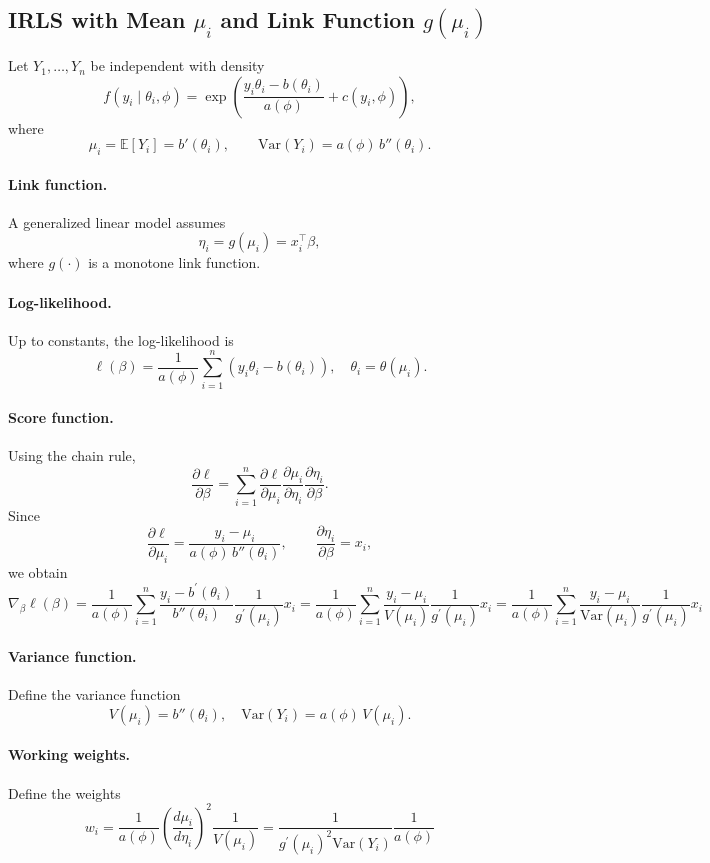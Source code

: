 \documentclass[11pt]{article}
\theoremstyle{definition}
\begin{document}
\subsection{IRLS with Mean $\mu_i$ and Link Function $g(\mu_i)$}

Let $Y_1,\dots,Y_n$ be independent with density
\[
f(y_i \mid \theta_i,\phi)
=
\exp\!\left(
\frac{y_i \theta_i - b(\theta_i)}{a(\phi)}
+ c(y_i,\phi)
\right),
\]
where
\[
\mu_i = \mathbb{E}[Y_i] = b'(\theta_i),
\qquad
\mathrm{Var}(Y_i) = a(\phi)\, b''(\theta_i).
\]

\paragraph{Link function.}
A generalized linear model assumes
\[
\eta_i = g(\mu_i) = x_i^\top \beta,
\]
where $g(\cdot)$ is a monotone link function.

\paragraph{Log-likelihood.}
Up to constants, the log-likelihood is
\[
\ell(\beta)
=
\frac{1}{a(\phi)}
\sum_{i=1}^n
\left(
y_i \theta_i - b(\theta_i)
\right),
\quad
\theta_i = \theta(\mu_i).
\]

\paragraph{Score function.}
Using the chain rule,
\[
\frac{\partial \ell}{\partial \beta}
=
\sum_{i=1}^n
\frac{\partial \ell}{\partial \mu_i}
\frac{\partial \mu_i}{\partial \eta_i}
\frac{\partial \eta_i}{\partial \beta}.
\]
Since
\[
\frac{\partial \ell}{\partial \mu_i}
=
\frac{y_i - \mu_i}{a(\phi)\, b''(\theta_i)},
\qquad
\frac{\partial \eta_i}{\partial \beta} = x_i,
\]
we obtain
\[
\nabla_\beta \ell(\beta)=
\frac{1}{a(\phi)}
\sum_{i=1}^n
\frac{y_i - b^{\prime}(\theta_i)}{b''(\theta_i)}
\frac{1}{g^\prime(\mu_i)}
x_i=
\frac{1}{a(\phi)}
\sum_{i=1}^n
\frac{y_i - \mu_i}{V(\mu_i)}
\frac{1}{g^\prime(\mu_i)}
x_i =
\frac{1}{a(\phi)}
\sum_{i=1}^n
\frac{y_i - \mu_i}{\text{Var}(\mu_i)}
\frac{1}{g^\prime(\mu_i)}
x_i
\]

\paragraph{Variance function.}
Define the variance function
\[
V(\mu_i) = b''(\theta_i),
\quad
\mathrm{Var}(Y_i) = a(\phi)\,V(\mu_i).
\]

\paragraph{Working weights.}
Define the weights
\[
w_i
=
\frac{1}{a(\phi)}
\left(\frac{d\mu_i}{d\eta_i}\right)^2
\frac{1}{V(\mu_i)} = \frac{1}{g^\prime(\mu_i)^2\text{Var}(Y_i)}\frac{1}{a(\phi)}
\]
\end{document}
